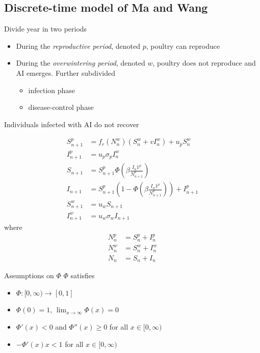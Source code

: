 \documentclass[aspectratio=43]{beamer}
\begin{document}
\subsection{Discrete-time model of Ma and Wang}

\begin{frame}{Divide year in two periods}
  \begin{itemize}
    \item During the \emph{reproductive period}, denoted $p$, poultry can reproduce
    \vfill
    \item During the \emph{overwintering period}, denoted $w$, poultry does not reproduce and AI emerges. Further subdivided
    \begin{itemize}
      \item infection phase
      \item disease-control phase
    \end{itemize}
  \end{itemize}
  \vfill
  Individuals infected with AI do not recover
\end{frame}

\begin{frame}
  \begin{align*}
  S_{n+1}^p &= f_r(N_n^w)(S_n^w+vI_n^w)+u_pS_n^w \\
  I_{n+1}^p &= u_p\sigma_pI_n^w \\
  S_{n+1} &= S_{n+1}^p\Phi\left(
    \beta\frac{I_{n}1^p}{N_{n+1}^p}
  \right) \\
  I_{n+1} &= S_{n+1}^p\left(1-\Phi\left(
    \beta\frac{I_{n}1^p}{N_{n+1}^p}
  \right)\right)+I_{n+1}^p \\
  S_{n+1}^w &= u_wS_{n+1} \\
  I_{n+1}^w &= u_w\sigma_wI_{n+1}
  \end{align*}
  where
  \begin{align*}
    N_n^p &= S_n^p+I_n^p \\
    N_n^w &= S_n^w+I_n^w \\
    N_n &= S_n+I_n 
  \end{align*}
\end{frame}

\begin{frame}{Assumptions on $\Phi$}
  $\Phi$ satisfies
  \begin{itemize}
    \item $\Phi:[0,\infty)\to[0,1]$
    \item $\Phi(0)=1$, $\lim_{x\to\infty}\Phi(x)=0$
    \item $\Phi'(x)<0$ and $\Phi''(x)\geq 0$ for all $x\in[0,\infty)$
    \item $-\Phi'(x)x<1$ for all $x\in[0,\infty)$
  \end{itemize}
\end{frame}
\end{document}
